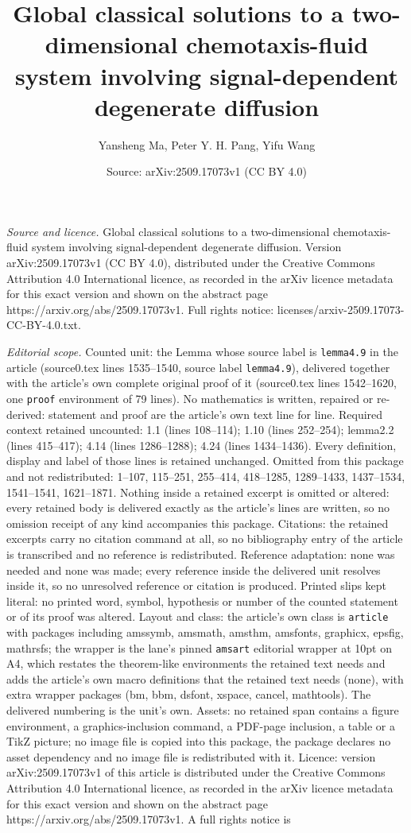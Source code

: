 \documentclass[10pt,a4paper]{amsart}
\title[Global classical solutions to a two-dimensional chemotaxis-f]{Global classical solutions to a two-dimensional chemotaxis-fluid system involving signal-dependent degenerate diffusion}
\author{Yansheng Ma, Peter Y. H. Pang, Yifu Wang}
\date{Source: arXiv:2509.17073v1 (CC BY 4.0)}
\begin{document}
\maketitle

\noindent\emph{Source and licence.} Global classical solutions to a two-dimensional chemotaxis-fluid system involving signal-dependent degenerate diffusion. Version arXiv:2509.17073v1 (CC BY 4.0), distributed under the Creative Commons Attribution 4.0 International licence, as recorded in the arXiv licence metadata for this exact version and shown on the abstract page https://arxiv.org/abs/2509.17073v1. Full rights notice: licenses/arxiv-2509.17073-CC-BY-4.0.txt.\par\smallskip

\noindent\textit{Editorial scope.} Counted unit: the Lemma whose source label is \texttt{lemma4.9} in the article (source0.tex lines 1535--1540, source label \texttt{lemma4.9}), delivered together with the article's own complete original proof of it (source0.tex lines 1542--1620, one \texttt{proof} environment of 79 lines). No mathematics is written, repaired or re-derived: statement and proof are the article's own text line for line. Required context retained uncounted: 1.1 (lines 108--114); 1.10 (lines 252--254); lemma2.2 (lines 415--417); 4.14 (lines 1286--1288); 4.24 (lines 1434--1436). Every definition, display and label of those lines is retained unchanged. Omitted from this package and not redistributed: 1--107, 115--251, 255--414, 418--1285, 1289--1433, 1437--1534, 1541--1541, 1621--1871. Nothing inside a retained excerpt is omitted or altered: every retained body is delivered exactly as the article's lines are written, so no omission receipt of any kind accompanies this package. Citations: the retained excerpts carry no citation command at all, so no bibliography entry of the article is transcribed and no reference is redistributed. Reference adaptation: none was needed and none was made; every reference inside the delivered unit resolves inside it, so no unresolved reference or citation is produced. Printed slips kept literal: no printed word, symbol, hypothesis or number of the counted statement or of its proof was altered. Layout and class: the article's own class is \texttt{article} with packages including amssymb, amsmath, amsthm, amsfonts, graphicx, epsfig, mathrsfs; the wrapper is the lane's pinned \texttt{amsart} editorial wrapper at 10pt on A4, which restates the theorem-like environments the retained text needs and adds the article's own macro definitions that the retained text needs (none), with extra wrapper packages (bm, bbm, dsfont, xspace, cancel, mathtools). The delivered numbering is the unit's own. Assets: no retained span contains a figure environment, a graphics-inclusion command, a PDF-page inclusion, a table or a TikZ picture; no image file is copied into this package, the package declares no asset dependency and no image file is redistributed with it. Licence: version arXiv:2509.17073v1 of this article is distributed under the Creative Commons Attribution 4.0 International licence, as recorded in the arXiv licence metadata for this exact version and shown on the abstract page https://arxiv.org/abs/2509.17073v1. A full rights notice is 
\end{document}
